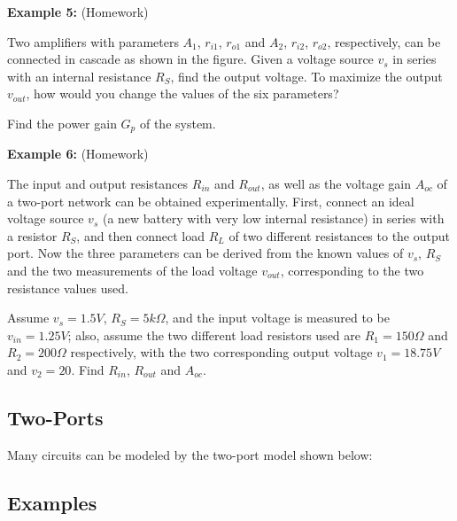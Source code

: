 


{\bf Example 5:} (Homework)


Two amplifiers with parameters $A_1$, $r_{i1}$, $r_{o1}$ and $A_2$, $r_{i2}$, 
$r_{o2}$, respectively, can be connected in cascade as shown in the figure. 
Given a voltage source $v_s$ in series with an internal resistance $R_S$,
find the output voltage. To maximize the output $v_{out}$, how would you 
change the values of the six parameters?

Find the power gain $G_p$ of the system.



{\bf Example 6:} (Homework)

The input and output resistances $R_{in}$ and $R_{out}$, as well as the voltage 
gain $A_{oc}$ of a two-port network can be obtained experimentally. First,
connect an ideal voltage source $v_s$ (a new battery with very low internal
resistance) in series with a resistor $R_S$, and then connect load $R_L$ of
two different resistances to the output port. Now the three parameters can
be derived from the known values of $v_s$, $R_S$ and the two measurements of
the load voltage $v_{out}$, corresponding to the two resistance values used.

Assume $v_s=1.5V$, $R_S=5 k\Omega$, and the input voltage is measured to be 
$v_{in}=1.25 V$; also, assume the two different load resistors used are 
$R_1=150 \Omega$ and $R_2=200 \Omega$ respectively, with the two corresponding
output voltage $v_1=18.75V$ and $v_2=20$. Find $R_{in}$, $R_{out}$ and $A_{oc}$.





\subsection*{Two-Ports}

Many circuits can be modeled by the two-port model shown below:


	

\subsection*{Examples}
	

